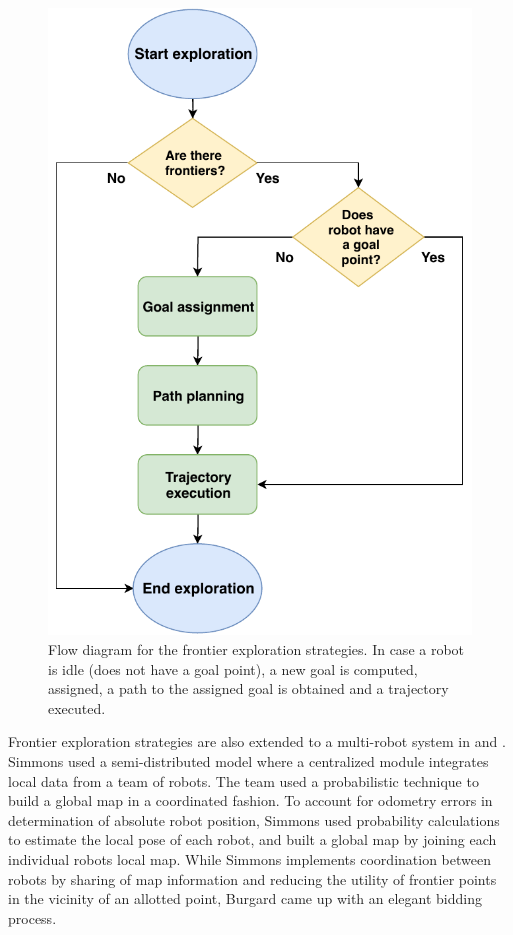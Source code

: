 \begin{figure}[t!]
	\centering\includegraphics[width=0.75\columnwidth]{./pictures/flow_diagram.pdf}
	\caption{Flow diagram for the frontier exploration strategies. In case a robot is idle (does not have a goal point), a new goal is computed, assigned, a path to the assigned goal is obtained and a trajectory executed.}
	\label{fig:flow_diagram}
\end{figure}

Frontier exploration strategies are also extended to a multi-robot system in \cite{Simmons2000} and \cite{Burgard2005}. Simmons \cite{Simmons2000} used a semi-distributed model where a centralized module integrates local data from a team of robots. The team used a probabilistic technique to build a global map in a coordinated fashion. To account for odometry errors in determination of absolute robot position, Simmons used probability calculations to estimate the local pose of each robot, and built a global map by joining each individual robots local map. 
While Simmons \cite{Simmons2000} implements coordination between robots by sharing of map information and reducing the utility of frontier points in the vicinity of an allotted point, Burgard \cite{Burgard2005} came up with an elegant bidding process. 

